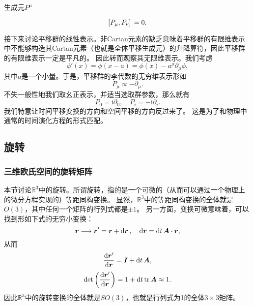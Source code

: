 \documentclass[hyperref, UTF8, a4paper]{ctexart}
\newcommand*{\ii}{\mathrm{i}}
\newcommand*{\reals}{\mathbb{R}}
\begin{document}
生成元$P^\mu$

\begin{equation}
    \comm*{P_\mu}{P_\nu} = 0.
    \label{eq:comm-of-trans}
\end{equation}

接下来讨论平移群的线性表示。非Cartan元素的缺乏意味着平移群的有限维表示中不能够构造其Cartan元素（也就是全体平移生成元）的升降算符，因此平移群的有限维表示一定是平凡的。
因此转而观察其无限维表示。我们考虑
\[
    \phi'(x) = \phi(x - a) = \phi(x) - a^\mu \partial_\mu \phi,
\]
其中$a$是一个小量。于是，平移群的李代数的无穷维表示形如
\[
    P_\mu \propto - \partial_\mu.
\]
不失一般性地我们取幺正表示，并适当选取群参数，那么就有
\begin{equation}
    P_0 = \ii \partial_0, \quad P_i = - \ii \partial_i.
    \label{eq:transition-inf-rep}
\end{equation}
我们特意让时间平移变换的方向和空间平移的方向反过来了。
这是为了和物理中通常的时间演化方程的形式匹配。

\subsection{旋转}\label{sec:rotation}

\subsubsection{三维欧氏空间的旋转矩阵}

本节讨论$\reals^3$中的旋转。所谓旋转，指的是一个可微的（从而可以通过一个物理上的微分方程实现的）等距同构变换。
显然，$\reals^3$中的等距同构变换的全体就是$O(3)$，其中任何一个矩阵的行列式都是$\pm 1$。
另一方面，变换可微意味着，可以找到形如下式的无穷小变换：
\[
    \vb*{r} \longrightarrow \vb*{r}' = \vb*{r} + \dd{\vb*{r}}, \quad \dd{\vb*{r}} = \dd{t} \vb*{A} \cdot \vb*{r},
\]
从而
\[
    \dv{\vb*{r}'}{\vb*{r}} = \vb*{I} + \dd{t} \vb*{A},
\]
\[
    \det \left( \dv{\vb*{r}'}{\vb*{r}} \right) = 1 + \dd{t} \trace \vb*{A} \approx 1.
\]
因此$\reals^3$中的旋转变换的全体就是$SO(3)$，也就是行列式为1的全体$3\times 3$矩阵。
\end{document}
